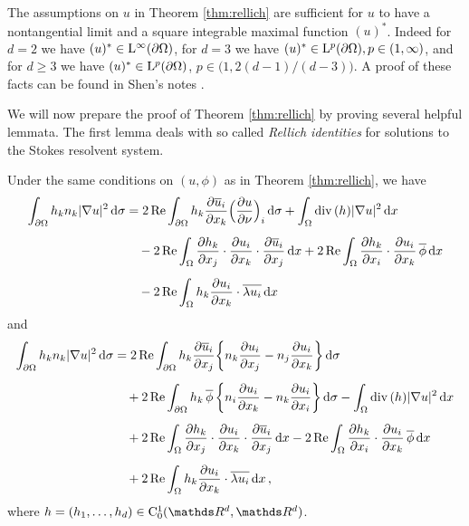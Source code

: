 \begin{rem}
  \label{rem:shenNontangential}
  The assumptions on $u$ in Theorem \ref{thm:rellich} are sufficient for $u$ to have a nontangential limit and a square integrable maximal function $(u)^*$. 
  Indeed for $d = 2$ we have $(u)^* \in \mathrm{L}^\infty(\partial\Omega)$, for $d = 3$ we have $(u)^* \in \mathrm{L}^p(\partial\Omega), p \in (1,\infty)$, and for $d \geq 3$ we have $(u)^* \in \mathrm{L}^p(\partial\Omega)$, $p \in \big(1, 2 (d - 1) / (d - 3) \big)$.
  A proof of these facts can be found in Shen's notes \cite[Prop. 7.1.3]{Shen2017}.
\end{rem}

We will now prepare the proof of Theorem \ref{thm:rellich} by proving several helpful lemmata.
The first lemma deals with so called \emph{Rellich identities} for solutions to the Stokes resolvent system.

\begin{lem}
  \label{lem:rellichIdentity}
  Under the same conditions on $(u,\phi)$ as in Theorem \ref{thm:rellich}, we have
  \begin{align}
    \int_{\partial\Omega} h_k n_k |\nabla u|^2 \, {\operatorname{d}\!{\sigma}} 
    &= 2 \operatorname{Re} \int_{\partial\Omega} h_k \frac{\partial \overline u_i}{\partial x_k} \Big( \frac{\partial u}{\partial \nu} \Big)_i \, {\operatorname{d}\!{\sigma}} + \int_\Omega \mathrm{div\,} (h) |\nabla u|^2 \, {\operatorname{d}\!{x}} \nonumber\\[0.5em]
    &\quad - 2 \operatorname{Re} \int_\Omega \frac{\partial h_k}{\partial x_j} \cdot \frac{\partial u_i}{\partial x_k} \cdot \frac{\partial \overline u_i}{\partial x_j} \, {\operatorname{d}\!{x}} + 2 \operatorname{Re} \int_\Omega \frac{\partial h_k}{\partial x_i} \cdot \frac{\partial u_i}{\partial x_k} \, \overline \phi \, {\operatorname{d}\!{x}} \nonumber\\[0.5em]
    &\quad - 2 \operatorname{Re} \int_\Omega h_k \frac{\partial u_i}{\partial x_k} \cdot \overline {\lambda u_i} \, {\operatorname{d}\!{x}} \label{eq:rellichIdentity}
  \end{align}
  and
  \begin{align}
    \int_{\partial\Omega} h_k n_k |\nabla u|^2 \, {\operatorname{d}\!{\sigma}}
    &= 2\operatorname{Re} \int_{\partial\Omega} h_k \frac{\partial \overline u_i}{\partial x_j} \bigg\{ n_k \frac{\partial u_i}{\partial x_j} - n_j \frac{\partial u_i}{\partial x_k} \bigg\} \, {\operatorname{d}\!{\sigma}} \nonumber\\[0.5em]
    &\quad + 2 \operatorname{Re} \int_{\partial\Omega} h_k \, \overline \phi \, \bigg\{ n_i \frac{\partial u_i}{\partial x_k} - n_k \frac{\partial u_i}{\partial x_i} \bigg\} \, {\operatorname{d}\!{\sigma}} - \int_\Omega \mathrm{div\,} (h) |\nabla u|^2 \, {\operatorname{d}\!{x}} \nonumber\\[0.5em]
    &\quad + 2 \operatorname{Re} \int_\Omega \frac{\partial h_k}{\partial x_j} \cdot \frac{\partial u_i}{\partial x_k} \cdot \frac{\partial \overline u_i}{\partial x_j} \, {\operatorname{d}\!{x}} - 2 \operatorname{Re} \int_\Omega \frac{\partial h_k}{\partial x_i} \cdot \frac{\partial u_i}{\partial x_k} \, \overline \phi \, {\operatorname{d}\!{x}} \nonumber\\[0.5em]
    &\quad + 2 \operatorname{Re} \int_\Omega h_k \frac{\partial u_i}{\partial x_k} \cdot \overline{ \lambda u_i} \, {\operatorname{d}\!{x}}\,, \label{eq:rellichIdentity2}
  \end{align}
  where $h = (h_1, \dots,h_d) \in \CC_0^1(\R^d, \R^d)$.
\end{lem}


